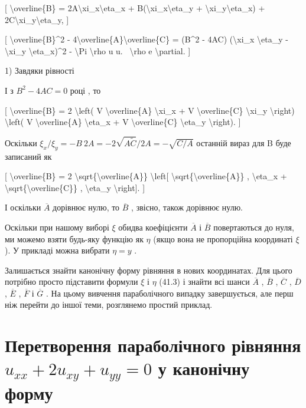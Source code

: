 \documentclass[
]{article}
\begin{document}
{[} \textbackslash overline\{B\} =
2A\textbackslash xi\_x\textbackslash eta\_x +
B(\textbackslash xi\_x\textbackslash eta\_y +
\textbackslash xi\_y\textbackslash eta\_x) +
2C\textbackslash xi\_y\textbackslash eta\_y, {]}

{[} \textbackslash overline\{B\}\^{}2 -
4\textbackslash overline\{A\}\textbackslash overline\{C\} = (B\^{}2 -
4AC) (\textbackslash xi\_x \textbackslash eta\_y - \textbackslash xi\_y
\textbackslash eta\_x)\^{}2 - \textbackslash Pi \textbackslash rho u u.
~\textbackslash rho e \textbackslash partial. {]}

1) Завдяки рівності

І з \(B^2 - 4AC = 0\) році , то

{[} \textbackslash overline\{B\} = 2 \textbackslash left( V
\textbackslash overline\{A\} \textbackslash xi\_x + V
\textbackslash overline\{C\} \textbackslash xi\_y \textbackslash right)
\textbackslash left( V \textbackslash overline\{A\}
\textbackslash eta\_x + V \textbackslash overline\{C\}
\textbackslash eta\_y \textbackslash right). {]}

Оскільки
\(\xi_x/\xi_y = -B \ 2A = -2 \sqrt{A\tilde{C}}/2A = -\sqrt{C/A}\)
останній вираз для B буде записаний як

{[} \textbackslash overline\{B\} = 2
\textbackslash sqrt\{\textbackslash overline\{A\}\}
\textbackslash left{[}
\textbackslash sqrt\{\textbackslash overline\{A\}\} ,
\textbackslash eta\_x +
\textbackslash sqrt\{\textbackslash overline\{C\}\} ,
\textbackslash eta\_y \textbackslash right{]}. {]}

І оскільки \(\overline{A}\) дорівнює нулю, то \(\overline{B}\) , звісно,
також дорівнює нулю.

Оскільки при нашому виборі \(\xi\) обидва коефіцієнти \(\overline{A}\) і
\(\overline{B}\) повертаються до нуля, ми можемо взяти будь-яку функцію
як \(\eta\) (якщо вона не пропорційна координаті \(\xi\) ). У прикладі
можна вибрати \(\eta = y\) .

Залишається знайти канонічну форму рівняння в нових координатах. Для
цього потрібно просто підставити формули \(\xi\) і \(\eta\) (41.3) і
знайти всі шанси \(\overline{A}\) , \(\overline{B}\) , \(\overline{C}\)
, \(\overline{D}\) , \(\overline{E}\) , \(\overline{F}\) і
\(\overline{G}\) . На цьому вивчення параболічного випадку завершується,
але перш ніж перейти до іншої теми, розглянемо простий приклад.

\section{\texorpdfstring{Перетворення параболічного рівняння
\(u_{xx} + 2u_{xy} + u_{yy} = 0\) у канонічну
форму}{Перетворення параболічного рівняння u\_\{xx\} + 2u\_\{xy\} + u\_\{yy\} = 0 у канонічну форму}}\label{ux43fux435ux440ux435ux442ux432ux43eux440ux435ux43dux43dux44f-ux43fux430ux440ux430ux431ux43eux43bux456ux447ux43dux43eux433ux43e-ux440ux456ux432ux43dux44fux43dux43dux44f-u_xx-2u_xy-u_yy-0-ux443-ux43aux430ux43dux43eux43dux456ux447ux43dux443-ux444ux43eux440ux43cux443}
\end{document}
